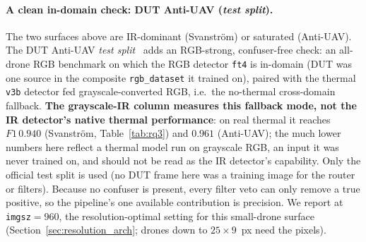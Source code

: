\begin{table}[htbp]
    \centering
    \caption{RQ3: single modality vs routed pipeline (bare per-modality rows vs the production cell). Each modality is scored against its own GT; the routed row is trust-aware. The modality ranking \emph{reverses} between surfaces; the routed no-reject system matches the stronger modality on each without being told which it is.}
    \label{tab:rq3}
\end{table}

\paragraph{A clean in-domain check: DUT Anti-UAV (\emph{test split}).}
The two surfaces above are IR-dominant (Svanstr\"om) or saturated (Anti-UAV). The DUT Anti-UAV \emph{test split}~\cite{zhao2022dutantiuav} adds an RGB-strong, confuser-free check: an all-drone RGB benchmark on which the RGB detector \texttt{ft4} is in-domain (DUT was one source in the composite \texttt{rgb\_dataset} it trained on), paired with the thermal \texttt{v3b} detector fed grayscale-converted RGB, i.e.\ the no-thermal cross-domain fallback. \textbf{The grayscale-IR column measures this fallback mode, not the IR detector's native thermal performance}: on real thermal it reaches $F1\,0.940$ (Svanstr\"om, Table~\ref{tab:rq3}) and $0.961$ (Anti-UAV); the much lower numbers here reflect a thermal model run on grayscale RGB, an input it was never trained on, and should not be read as the IR detector's capability. Only the official test split is used (no DUT frame here was a training image for the router or filters). Because no confuser is present, every filter veto can only remove a true positive, so the pipeline's one available contribution is precision. We report at \texttt{imgsz}$=$960, the resolution-optimal setting for this small-drone surface (Section~\ref{sec:resolution_arch}; drones down to $25\times9$~px need the pixels).

